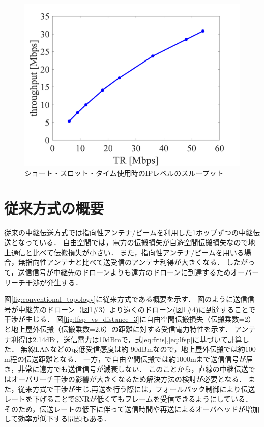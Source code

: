 \documentclass[a4paper,10.5pt]{ltjsarticle}
\begin{document}
\begin{figure}[H]
  \centering
  \includegraphics[width=\linewidth]{g_throughput.pdf} %
  \caption{ショート・スロット・タイム使用時のIPレベルのスループット}
  \label{fig:11g_throughput} %
\end{figure}


\clearpage
\section{従来方式の概要}

従来の中継伝送方式では指向性アンテナ/ビームを利用した1ホップずつの中継伝送となっている．
自由空間では，電力の伝搬損失が自遊空間伝搬損失なので地上通信と比べて伝搬損失が小さい．
また，指向性アンテナ/ビームを用いる場合，無指向性アンテナと比べて送受信のアンテナ利得が大きくなる．
したがって，送信信号が中継先のドローンよりも遠方のドローンに到達するためオーバーリーチ干渉が発生する．\par
図\ref{fig:conventional_topology}に従来方式である概要を示す．
図のように送信信号が中継先のドローン（図1\#3）より遠くのドローン(図1\#4)に到達することで干渉が生じる．
図\ref{fig:lfsp_vs_distance_3}に自由空間伝搬損失（伝搬乗数=2）と地上屋外伝搬（伝搬乗数=2.6）の距離に対する受信電力特性を示す．
アンテナ利得は2.14dBi，送信電力は10dBmで，式\ref{eq:friis},\ref{eq:lfsp}に基づいて計算した．
無線LANなどの最低受信感度は約-90dBmなので，地上屋外伝搬では約100 m程の伝送距離となる．
一方，で自由空間伝搬では約1000mまで送信信号が届き，非常に遠方でも送信信号が減衰しない．
このことから，直線の中継伝送ではオーバリーチ干渉の影響が大きくなるため解決方法の検討が必要となる．
また，従来方式で干渉が生じ,再送を行う際には，フォールバック制御により伝送レートを下げることでSNRが低くてもフレームを受信できるようにしている．
そのため，伝送レートの低下に伴って送信時間や再送によるオーバヘッドが増加して効率が低下する問題もある．
\end{document}
